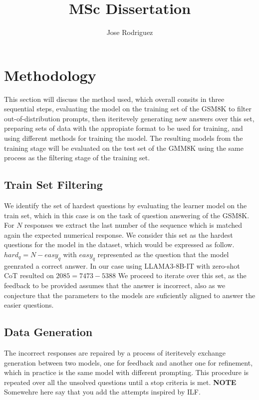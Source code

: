 \documentclass[a4paper,10pt]{article}
\title{MSc Dissertation}
\author{Jose Rodriguez}
\begin{document}
\maketitle

\begin{abstract}

\end{abstract}

\section{Methodology}
This section will discuss the method used, which overall consits in three sequential steps, evaluating the model on the training set of the GSM8K to filter out-of-distribution prompts, then iteritevely generating new answers over this set, preparing sets of data with the appropiate format to be used for training, and using different methods for training the model. The resulting models from the training stage will be evaluated on the test set of the GMM8K using the same process as the filtering stage of the training set.
\subsection{Train Set Filtering}
We identify the set of hardest questions by evaluating the learner model on the train set, which in this case is on the task of question answering of the GSM8K. For $N$ responses we extract the last number of the sequence which is matched again the expected numerical response. We consider this set as the hardest questions for the model in the dataset, which would be expressed as follow. $ hard_q =  N - easy_q $ with $easy_q$ represented as the question that the model geenrated a correct answer.
In our case using LLAMA3-8B-IT with zero-shot CoT resulted on $ 2085 = 7473 - 5388 $ We proceed to iterate over this set, as the feedback to be provided assumes that the answer is incorrect, also as we conjecture that the parameters to the models are suficiently aligned to answer the easier questions.
\subsection{Data Generation}
The incorrect responses are repaired by a process of iteritevely exchange generation between two models, one for feedback and another one for refinement, which in practice is the same model with different prompting. This procedure is repeated over all the unsolved questions until a stop criteria is met. \textbf{NOTE} Somewehre here say that you add the attempts inspired by ILF.
\end{document}

